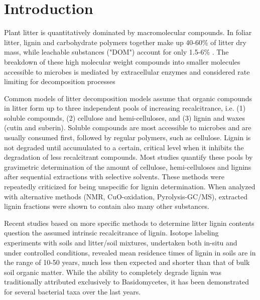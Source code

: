 \section*{Introduction}

Plant litter is quantitatively dominated by macromolecular compounds. In foliar litter, lignin and carbohydrate polymers together make up 40-60\% of litter dry mass\cite{Berg2008}, while leachable substances ("DOM") account for only 1.5-6\% \cite{Don2005}. The breakdown of these high molecular weight compounds into smaller molecules accessible to microbes is mediated by extracellular enzymes and considered rate limiting for decomposition processes \cite{Sinsabaugh2010}

Common models of litter decomposition models\cite{Berg1980, Couteaux1995, Moorhead2006, Adair2008} assume that organic compounds in litter form up to three independent pools of increasing recalcitrance, i.e. (1) soluble compounds, (2) cellulose and hemi-celluloses, and (3) lignin and waxes (cutin and suberin). Soluble compounds are most accessible to microbes and are usually consumed first, followed by regular polymers, such as cellulose. Lignin is not degraded until accumulated to a certain, critical level when it inhibits the degradation of less recalcitrant compounds. Most studies quantify these pools by gravimetric determination of the amount of cellulose, hemi-celluloses and lignins after sequential extractions with selective solvents. These methods were repeatedly criticized for being unspecific for lignin determination\cite{Hatfield2005}. When analyzed with alternative methods (NMR, CuO-oxidation, Pyrolysis-GC/MS), extracted lignin fractions were shown to contain also many other substances\cite{Preston1997}.

Recent studies based on more specific methods to determine litter lignin contents question the assumed intrinsic recalcitrance of lignin. Isotope labeling experiments with soils and litter/soil mixtures, undertaken both in-situ and under controlled conditions,  revealed mean residence times of lignin in soils are in the range of 10-50 years, much less then expected and shorter than that of bulk soil organic matter\cite{Amelung2008, Thevenot2010a, Bol2009}. While the ability to completely degrade lignin was traditionally  attributed exclusively to Basidomycetes, it has been demonstrated for several bacterial taxa over the last years\cite{Bugg2011}.

